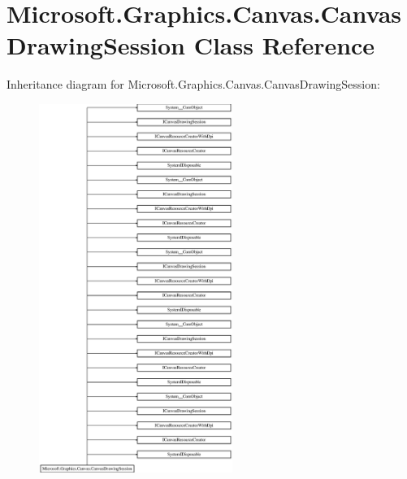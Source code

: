 \hypertarget{class_microsoft_1_1_graphics_1_1_canvas_1_1_canvas_drawing_session}{}\section{Microsoft.\+Graphics.\+Canvas.\+Canvas\+Drawing\+Session Class Reference}
\label{class_microsoft_1_1_graphics_1_1_canvas_1_1_canvas_drawing_session}
Inheritance diagram for Microsoft.\+Graphics.\+Canvas.\+Canvas\+Drawing\+Session\+:\begin{figure}[H]
\begin{center}
\leavevmode
\includegraphics[height=12.000000cm]{class_microsoft_1_1_graphics_1_1_canvas_1_1_canvas_drawing_session}
\end{center}
\end{figure}
